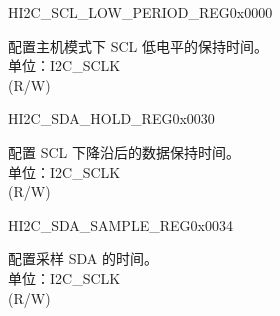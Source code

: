 \begin{register}{H}{I2C\_SCL\_LOW\_PERIOD\_REG}{0x0000}\label{regdesc:I2CSCLLOWPERIODREG}
%
%
\regnewline%
\begin{regdesc}\begin{reglist}
\label{fielddesc:I2CSCLLOWPERIOD}\item [I2C\_SCL\_LOW\_PERIOD] 配置主机模式下 SCL 低电平的保持时间。\\
单位：I2C\_SCLK \\ (R/W)
\end{reglist}\end{regdesc}
\end{register}


\begin{register}{H}{I2C\_SDA\_HOLD\_REG}{0x0030}\label{regdesc:I2CSDAHOLDREG}
%
%
\regnewline%
\begin{regdesc}\begin{reglist}
\label{fielddesc:I2CSDAHOLDTIME}\item [I2C\_SDA\_HOLD\_TIME] 配置 SCL 下降沿后的数据保持时间。\\
单位：I2C\_SCLK \\ (R/W)
\end{reglist}\end{regdesc}
\end{register}


\begin{register}{H}{I2C\_SDA\_SAMPLE\_REG}{0x0034}\label{regdesc:I2CSDASAMPLEREG}
%
%
\regnewline%
\begin{regdesc}\begin{reglist}
\label{fielddesc:I2CSDASAMPLETIME}\item [I2C\_SDA\_SAMPLE\_TIME] 配置采样 SDA 的时间。\\
单位：I2C\_SCLK \\ (R/W)
\end{reglist}\end{regdesc}
\end{register}


